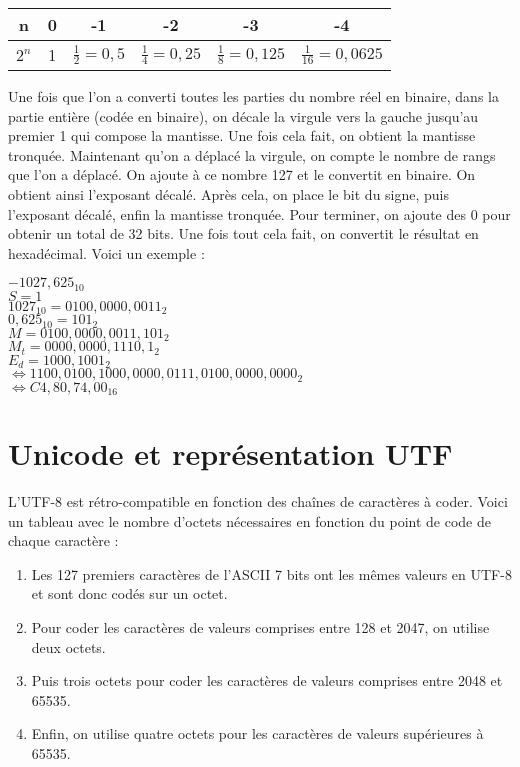 \documentclass{article}
\begin{document}
		\begin{center}
			\begin{tabular}{ | c | c | c | c | c | c | }
  				\hline
  					n & 0 & -1 & -2 & -3 & -4 \\
  				\hline
  					$2^n$ & 1 & $\frac{1}{2} = 0,5$ & $\frac{1}{4} = 0,25$ & $\frac{1}{8} = 0,125$ & $\frac{1}{16} = 0,0625$ \\
	  			\hline
			\end{tabular}
		\end{center}
	
		Une fois que l'on a converti toutes les parties du nombre réel en binaire, dans la partie entière (codée en binaire), on décale la virgule vers la gauche jusqu'au premier 1 qui compose la mantisse. Une fois cela fait, on obtient la mantisse tronquée. Maintenant qu'on a déplacé la virgule, on compte le nombre de rangs que l'on a déplacé. On ajoute à ce nombre 127 et le convertit en binaire. On obtient ainsi l'exposant décalé. Après cela, on place le bit du signe, puis l'exposant décalé, enfin la mantisse tronquée. Pour terminer, on ajoute des 0 pour obtenir un total de 32 bits. Une fois tout cela fait, on convertit le résultat en hexadécimal. Voici un exemple :
		
		\begin{center}
			$-1027,625_{10}$ \\
			$S = 1$ \\
			$1027_{10} = 0100,0000,0011_2$ \\
			$0,625_{10} = 101_2$ \\
			$M = 0100,0000,0011,101_2$ \\
			$M_t = 0000,0000,1110,1_2$ \\
			$E_d = 1000,1001_2$ \\
			$\iff 1100,0100,1000,0000,0111,0100,0000,0000_2$ \\
			$\iff C4,80,74,00_{16}$
		\end{center} 
				
		\section{Unicode et représentation UTF}
			L'UTF-8 est rétro-compatible en fonction des chaînes de caractères à coder. Voici un tableau avec le nombre d'octets nécessaires en fonction du point de code de chaque caractère : 
		
			\begin{enumerate}
				\item Les 127 premiers caractères de l'ASCII 7 bits ont les mêmes valeurs en UTF-8 et sont donc codés sur un octet.
				\item Pour coder les caractères de valeurs comprises entre 128 et 2047, on utilise deux octets.
				\item Puis trois octets pour coder les caractères de valeurs comprises entre 2048 et 65535.
				\item Enfin, on utilise quatre octets pour les caractères de valeurs supérieures à 65535.
			\end{enumerate}
			
\end{document}
